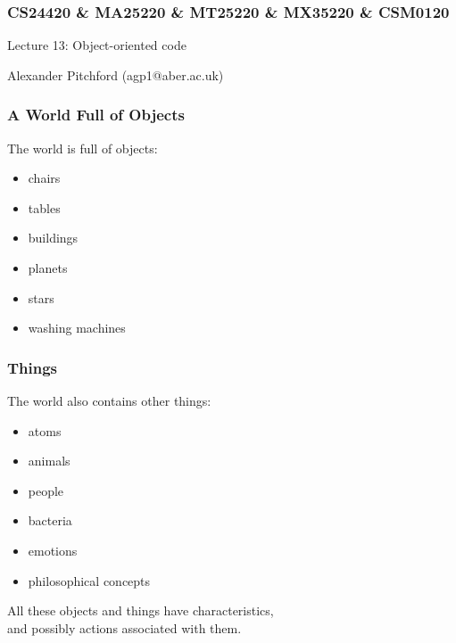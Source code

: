 \documentclass{beamer}
\begin{document}

\begin{frame}
\frametitle{CS24420 \& MA25220 \& MT25220 \& MX35220 \& CSM0120}

\begin{center}
\begin{huge}
Lecture 13: Object-oriented code 
\end{huge}
\bigskip

Alexander Pitchford (agp1@aber.ac.uk)

\end{center}
\end{frame}

\begin{frame}[fragile]
\frametitle{A World Full of Objects}
The world is full of objects:
\begin{itemize}
\item chairs
\item tables
\item buildings
\item planets
\item stars
\item washing machines
\end{itemize}

\end{frame}

\begin{frame}[fragile]
\frametitle{Things}
The world also contains other things:
\begin{itemize}
\item atoms
\item animals
\item people
\item bacteria
\item emotions
\item philosophical concepts
\end{itemize}

\bigskip
All these objects and things have characteristics,\\
\smallskip
and possibly actions associated with them.
\bigskip

\end{frame}
\end{document}
